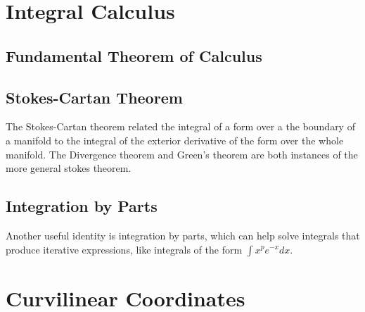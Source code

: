 \section{Integral Calculus}
\subsection{Fundamental Theorem of Calculus}

\subsection{Stokes-Cartan Theorem}
The Stokes-Cartan theorem related the integral of a form over a the boundary of a manifold to the integral of the exterior derivative of the form over the whole manifold. The Divergence theorem and Green's theorem are both instances of the more general stokes theorem.

\subsection{Integration by Parts}
Another useful identity is integration by parts, which can help solve integrals that produce iterative expressions, like integrals of the form $\int x^p e^{-x} dx$.

\section{Curvilinear Coordinates}
